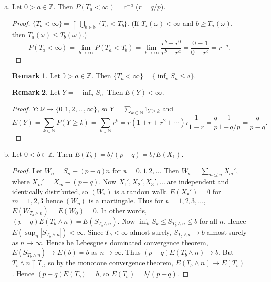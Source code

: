 \documentclass{article}
\newcommand{\Z}{\mathbb{Z}}
\newcommand{\N}{\mathbb{N}}
\theoremstyle{definition}
\newtheorem*{remark}{Remark}
\begin{document}
\begin{enumerate}[(a)]
\begin{proof}
        Now $S_N = a$ on $\{T_a < T_b\}$, $S_N - b$ on $\{T_b < T_a\}$, and $P(T_a = T_b) = 0$ because if $T_a(\omega) = T_b(\omega)$, then both are $\infty$, and $P(T_b = \infty) = 0$. Hence $1 = E[M_N] = r^a P(T_a < T_b) + r^b P(T_b < T_a)$ and $1 = P(T_a < T_b) + P(T_b < T_a)$. Thus $1 = r^a P(T_a < T_b) + r^b[1 - P(T_a < T_b)]$ so $1 - r^b = (r^a - r^b)P(T_a < T_b)$ so
        \[
            P(T_a < T_b) = \frac{1-r^b}{r^a - r^b} = \frac{r^b - r^0}{r^b - r^a}.
        \]
    \end{proof}
    \item Let $0 > a \in \Z$. Then $P(T_a < \infty) = r^{-a}$ ($r = q/p$).
    \begin{proof}
        $\{T_a < \infty\} = \uparrow \bigcup_{b \in \N} \{T_a < T_b\}$. (If $T_a(\omega) < \infty$ and $b \geq T_a(\omega)$, then $T_a(\omega) \leq T_b(\omega)$.)
        \[
            P(T_a < \infty) = \lim_{b \to \infty} P(T_a < T_b) = \lim_{b \to \infty} \frac{r^b - r^0}{r^b - r^a} = \frac{0-1}{0-r^a} = r^{-a}.
        \]
    \end{proof}
    \begin{remark}
    Let $0 > a \in \Z$. Then $\{T_a < \infty\} = \{\inf_n S_n \leq a\}$.
    \end{remark}
    \begin{remark}
    Let $Y = -\inf_n S_n$. Then $E(Y) < \infty$.
    \begin{proof}
        $Y : \Omega \to \{0, 1, 2, \dots, \infty\}$, so $Y = \sum_{k \in \N} 1_{Y \geq k}$ and
        \[
            E(Y) = \sum_{k \in \N} P(Y \geq k) = \sum_{k \in \N}  r^k = r(1 + r + r^2 + \cdots ) r\frac{1}{1-r} = \frac{q}{p}\frac{1}{1-q/p} = \frac{q}{p-q}.
        \]
    \end{proof}
    \end{remark}
    \item Let $0 < b \in \Z$. Then $E(T_b) = b/(p-q) = b/E(X_1)$.
    \begin{proof}
        Let $W_n = S_n - (p-q)n$ for $n = 0, 1, 2, \dots$ Then $W_n = \sum_{m \leq n} X_m'$, where $X_m' = X_m - (p-q)$. Now $X_1', X_2', X_3', \dots$ are independent and identically distributed, so $(W_n)$ is a random walk. $E(X_n') = 0$ for $m = 1, 2, 3$ hence $(W_n)$ is a martingale. Thus for $n = 1, 2, 3, \dots$, $E(W_{T_b \wedge n}) = E(W_0) = 0$. In other words, $(p - q)E(T_b \wedge n) = E(S_{T_b \wedge n})$. Now $\inf_k S_k \leq S_{T_b \wedge n} \leq b$ for all $n$. Hence $E(\sup_n |S_{T_b \wedge n}|) < \infty$. Since $T_b < \infty$ almost surely, $S_{T_b \wedge n} \to b$ almost surely as $n \to \infty$. Hence be Lebesgue's dominated convergence theorem, $E(S_{T_b \wedge n}) \to E(b) = b$ as $n \to \infty$. Thus $(p-q)E(T_b \wedge n) \to b$. But $T_b \wedge n \uparrow T_b$, so  by the monotone convergence theorem, $E(T_b \wedge n) \to E(T_b)$. Hence $(p-q)E(T_b) = b$, so $E(T_b) = b/(p-q)$.
    \end{proof}
\end{enumerate}
\end{document}
